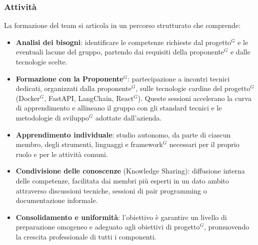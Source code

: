 \subsubsection{Attività}
La formazione del team si articola in un percorso strutturato che comprende:
\begin{itemize}[itemsep=3pt, parsep=1pt, label=$\scriptstyle\bullet$]
    \item \textbf{Analisi dei bisogni}: identificare le competenze richieste dal progetto$^G$ e le eventuali lacune del gruppo, partendo dai requisiti della proponente$^G$ e dalle tecnologie scelte.
    \item \textbf{Formazione con la Proponente$^G$}: partecipazione a incontri tecnici dedicati, organizzati dalla proponente$^G$, sulle tecnologie cardine del progetto$^G$ (Docker$^G$, FastAPI, LangChain, React$^G$). Queste sessioni accelerano la curva di apprendimento e allineano il gruppo con gli standard tecnici e le metodologie di sviluppo$^G$ adottate dall'azienda.
    \item \textbf{Apprendimento individuale}: studio autonomo, da parte di ciascun membro, degli strumenti, linguaggi e framework$^G$ necessari per il proprio ruolo e per le attività comuni.
    \item \textbf{Condivisione delle conoscenze} (Knowledge Sharing): diffusione interna delle competenze, facilitata dai membri più esperti in un dato ambito attraverso discussioni tecniche, sessioni di pair programming o documentazione informale.
    \item \textbf{Consolidamento e uniformità}: l'obiettivo è garantire un livello di preparazione omogeneo e adeguato agli obiettivi di progetto$^G$, promuovendo la crescita professionale di tutti i componenti.
\end{itemize}

